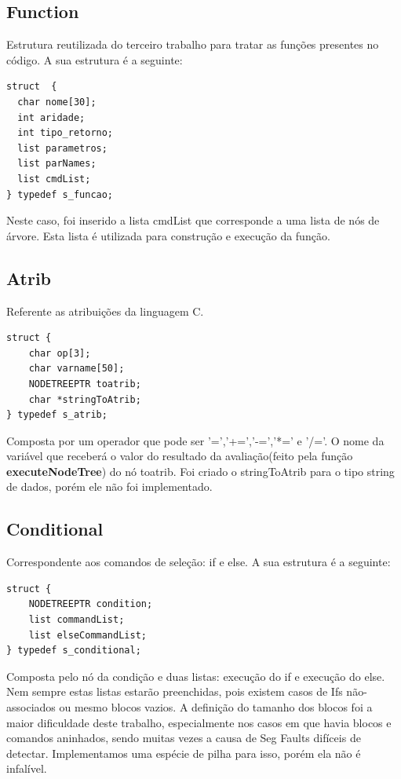 \documentclass[a4paper,10pt]{article}
\begin{document}
\subsection{Function}

Estrutura reutilizada do terceiro trabalho para tratar as funções presentes no código. A sua estrutura é a seguinte:

\begin{lstlisting}
struct  {
  char nome[30];
  int aridade;
  int tipo_retorno;
  list parametros;
  list parNames;
  list cmdList;
} typedef s_funcao;
\end{lstlisting}

Neste caso, foi inserido a lista cmdList que corresponde a uma lista de nós de árvore. Esta lista é utilizada para construção e execução da função.
\subsection{Atrib}

Referente as atribuições da linguagem C. 

\begin{lstlisting}
struct {
	char op[3];
	char varname[50];
	NODETREEPTR toatrib;
	char *stringToAtrib;
} typedef s_atrib;
\end{lstlisting}

Composta por um operador que pode ser '=','+=','-=','*=' e '/='. O nome da variável que receberá o valor do resultado da avaliação(feito pela função \textbf{executeNodeTree}) do nó toatrib. Foi criado o
stringToAtrib para o tipo string de dados, porém ele não foi implementado. 

\subsection{Conditional}

Correspondente aos comandos de seleção: if e else. A sua estrutura é a seguinte:

\begin{lstlisting}
struct {
	NODETREEPTR condition;
	list commandList;
	list elseCommandList;
} typedef s_conditional;
\end{lstlisting}

Composta pelo nó da condição e duas listas: execução do if e execução do else. Nem sempre estas listas estarão preenchidas, pois existem casos de Ifs
não-associados ou mesmo blocos vazios. A definição do tamanho dos blocos foi a maior dificuldade deste trabalho, especialmente nos casos em que havia
blocos e comandos aninhados, sendo muitas vezes a causa de Seg Faults difíceis de detectar. Implementamos uma espécie de pilha para isso, porém ela não é infalível. 
\end{document}
